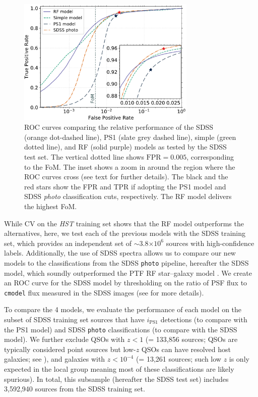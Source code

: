 \documentclass[twocolumn, dvipdfmx]{aastex62}
\begin{document}
\begin{figure}[t]
 \centering
  \includegraphics[width=3.35in]{./Figures/ROC_curves_log_inset2.pdf}
  \caption{ ROC curves comparing the relative performance of the SDSS (orange
  dot-dashed line), PS1 (slate grey dashed line), simple (green dotted line),
  and RF (solid purple) models as tested by the SDSS test set. The vertical
  dotted line shows $\mathrm{FPR} = 0.005$, corresponding to the FoM. The
  inset shows a zoom in around the region where the ROC curves cross (see
  text for further details). The black and the red stars show the FPR and TPR
  if adopting the PS1 model and SDSS \textit{photo} classification cuts,
  respectively. The RF model delivers the highest FoM.}
  \label{fig:roc_sdss}
\end{figure}

While CV on the \textit{HST} training set shows that the RF model
outperforms the alternatives, here, we test each of the previous models with
the SDSS training set, which provides an independent set of $\sim$3.8$\times
10^6$ sources with high-confidence
labels. Additionally, the use of SDSS spectra allows us to compare our new
models to the classifications from the SDSS \texttt{photo} pipeline,
hereafter the SDSS model, which soundly outperformed the PTF RF star--galaxy
model \citep{Miller17}. We create an ROC curve for the SDSS model by
thresholding on the ratio of PSF flux to \texttt{cmodel} flux measured in the
SDSS images (see \citealt{Miller17} for more details).

To compare the 4 models, we evaluate the performance of each model on the
subset of SDSS training set sources that have $i_\mathrm{PS1}$ detections
(to compare with the PS1 model) and SDSS \texttt{photo} classifications (to
compare with the SDSS model). We further exclude QSOs with $z < 1$ (=
133,856 sources; QSOs are typically considered point sources but low-$z$
QSOs can have resolved host galaxies; see \citealt{Miller17}), and galaxies
with $z < 10^{-4}$ (= 13,261 sources; such low $z$ is only expected in the
local group meaning most of these classifications are likely spurious). In
total, this subsample (hereafter the SDSS test set) includes 3,592,940
sources from the SDSS training set.
\end{document}
